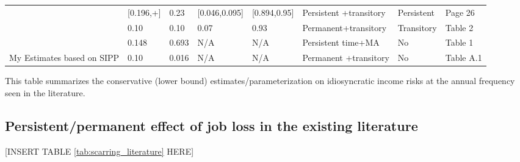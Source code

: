 \begin{sidewaystable}[p]
\begin{adjustbox}{width={\textwidth}}
\begin{threeparttable}
\begin{tabular}{llllllll}
\cite{krueger2016macroeconomics} & [0.196,+]      & 0.23            & [0.046,0.095] & [0.894,0.95] & Persistent +transitory                 & Persistent   & Page 26   \\
\cite{carroll2017distribution}   & 0.10           & 0.10            & 0.07          & 0.93         & Permanent+transitory                   & Transitory   & Table 2   \\
\cite{bayer2019precautionary}    & 0.148          & 0.693           & N/A           & N/A          & Persistent time+MA                     & No           & Table 1   \\
My Estimates based on SIPP       & 0.10           & 0.016           & N/A           & N/A          & Permanent +transitory                  & No           & Table A.1\\
\hline
\hline 
\end{tabular} 
	\begin{flushleft}
\item This table summarizes the  conservative (lower bound) estimates/parameterization on idiosyncratic income risks at the annual frequency seen in the literature.    \end{flushleft}
\end{threeparttable}
\end{adjustbox}
	\end{sidewaystable}
	
	
	

\subsection{Persistent/permanent effect of job loss in the existing literature}

\begin{center}
[INSERT TABLE \ref{tab:scarring_literature} HERE]  
\end{center}

